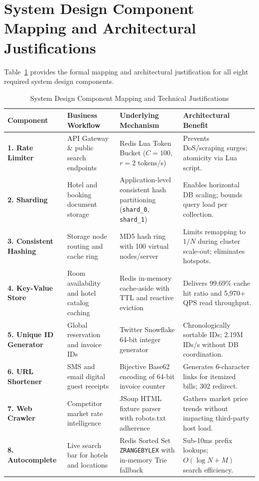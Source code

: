 \documentclass[11pt,a4paper]{article}
\begin{document}
\section{System Design Component Mapping and Architectural Justifications}

Table~\ref{tab:component_mapping} provides the formal mapping and architectural justification for all eight required system design components.

\begin{table}[H]
\centering
\small
\caption{System Design Component Mapping and Technical Justifications}
\label{tab:component_mapping}
\begin{tabularx}{\textwidth}{@{}>{\raggedright\arraybackslash}p{2.3cm} >{\raggedright\arraybackslash}X >{\raggedright\arraybackslash}X >{\raggedright\arraybackslash}p{2.5cm}@{}}
\toprule
\textbf{Component} & \textbf{Business Workflow} & \textbf{Underlying Mechanism} & \textbf{Architectural Benefit} \\
\midrule
\textbf{1. Rate Limiter} & API Gateway \& public search endpoints & Redis Lua Token Bucket ($C=100$, $r=2$ tokens/s) & Prevents DoS/scraping surges; atomicity via Lua script. \\
\addlinespace
\textbf{2. Sharding} & Hotel and booking document storage & Application-level consistent hash partitioning (\texttt{shard\_0}, \texttt{shard\_1}) & Enables horizontal DB scaling; bounds query load per collection. \\
\addlinespace
\textbf{3. Consistent Hashing} & Storage node routing and cache ring & MD5 hash ring with 100 virtual nodes/server & Limits remapping to $1/N$ during cluster scale-out; eliminates hotspots. \\
\addlinespace
\textbf{4. Key-Value Store} & Room availability and hotel catalog caching & Redis in-memory cache-aside with TTL and reactive eviction & Delivers 99.69\% cache hit ratio and 5,970+ QPS read throughput. \\
\addlinespace
\textbf{5. Unique ID Generator} & Global reservation and invoice IDs & Twitter Snowflake 64-bit integer generator & Chronologically sortable IDs; 2.19M IDs/s without DB coordination. \\
\addlinespace
\textbf{6. URL Shortener} & SMS and email digital guest receipts & Bijective Base62 encoding of 64-bit invoice counter & Generates 6-character links for itemized bills; 302 redirect. \\
\addlinespace
\textbf{7. Web Crawler} & Competitor market rate intelligence & JSoup HTML fixture parser with robots.txt adherence & Gathers market price trends without impacting third-party host load. \\
\addlinespace
\textbf{8. Autocomplete} & Live search bar for hotels and locations & Redis Sorted Set \texttt{ZRANGEBYLEX} with in-memory Trie fallback & Sub-10ms prefix lookups; $O(\log N + M)$ search efficiency. \\
\bottomrule
\end{tabularx}
\end{table}
\end{document}
